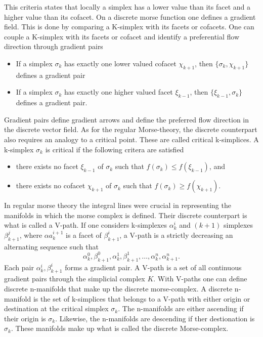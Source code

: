 This criteria states that locally a simplex has a lower value than its facet and
a higher value than its cofacet. On a discrete morse function one defines a
gradient field. This is done by comparing a K-simplex with its facets or
cofacets. One can couple a K-simplex with its facets or cofacet and identify a
preferential flow direction through gradient pairs
\begin{itemize}
    \item If a simplex $\sigma_k$ has exactly one lower valued cofacet $\chi_{k+1}$, then
          $\{\sigma_k,\chi_{k+1}\}$ defines a gradient pair
    \item If a simplex $\sigma_k$ has exactly one higher valued facet $\xi_{k-1}$, then
          $\{\xi_{k-1},\sigma_{k}\}$ defines a gradient pair.
\end{itemize}
Gradient pairs define gradient arrows and define the preferred flow direction in
the discrete vector field. As for the regular Morse-theory, the discrete
counterpart also requires an analogy to a critical point. These are called
critical k-simplices. A k-simplex $\sigma_k$ is critical if the following
critera are satisfied
\begin{itemize}
    \item there exists no facet $\xi_{k-1}$ of $\sigma_{k}$ such
    that $f(\sigma_k)\leq f(\xi_{k-1})$, and
    \item there exists no cofacet $\chi_{k+1}$ of $\sigma_{k}$ such
    that $f(\sigma_k)\geq f(\chi_{k+1})$.
\end{itemize}
In regular morse theory the integral lines were crucial in representing the
manifolds in which the morse complex is defined. Their discrete counterpart
is what is called a V-path. If one considers k-simplexes $\alpha^i_k$ and
$(k+1)$ simplexes $\beta^j_{k+1}$, where $\alpha a^{i+1}_k$ is a facet of $\beta^i_{k+1}$, a
V-path is a strictly decreasing an alternating sequence such that
\begin{equation}
    \alpha^0_k, \beta^0_{k+1},\alpha^1_k,\beta^1_{k+1},\dots,\alpha^n_k,\alpha^n_{k+1}.
\end{equation}
Each pair ${\alpha^i_k,\beta^i_{k+1}}$ forms a gradient pair. A V-path is a set
of all continuous gradient pairs through the simplicial complex $K$.
With V-paths one can define discrete n-manifolds that make up the discrete
morse-complex. A discrete n-manifold is the set of k-simplices that belongs to a
V-path with either origin or destination at the critical simplex $\sigma_k$.
The n-manifolds are either ascending if their origin is $\sigma_k$. Likewise,
the n-manifolds are descending if ther destionation is $\sigma_k$. These
manifolds make up what is called the discrete Morse-complex.

